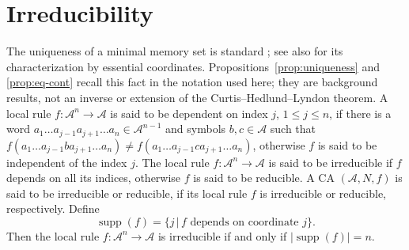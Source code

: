 \documentclass[11pt,a4paper]{article}
\newenvironment{revision}{\color{blue}}{}
\newenvironment{revision}{\color{black}}{}
\newcommand{\locmark}[1]{\label{#1}\linelabel{line:#1}}
\newcommand{\supp}{\mathop{\mathrm{supp}}}
\begin{document}
\section{Irreducibility}
\label{sec:irr}
\begin{revision}
\locmark{loc:minimal}
The uniqueness of a minimal memory set is standard
\cite[Section~1.5, Propositions~1.5.1--1.5.2]{CeccheriniCoornaert2010};
see also \cite[Proposition~1]{CastilloVeliz2024} for its characterization by
essential coordinates. Propositions~\ref{prop:uniqueness} and
\ref{prop:eq-cont} recall this fact in the notation used here; they are
background results, not an inverse or extension of the
Curtis--Hedlund--Lyndon theorem.
\end{revision}
A local rule $f : \mathcal{A}^n \to \mathcal{A}$ is said to be dependent on index $j$, $1 \le j \le n$,
if there is a word $a_1\ldots a_{j-1}a_{j+1}\ldots a_{n} \in \mathcal{A}^{n-1}$ and
symbols $b, c \in \mathcal{A}$ such that
$f(a_1\ldots a_{j-1}ba_{j+1}\ldots a_{n}) \ne f(a_1\ldots a_{j-1}ca_{j+1}\ldots a_{n})$,
otherwise $f$ is said to be independent of the index $j$.
The local rule $f: \mathcal{A}^n \to \mathcal{A}$ is said to be irreducible
if $f$ depends on all its indices, otherwise
$f$ is said to be reducible.
A CA $(\mathcal{A}, N, f)$ is said to be irreducible or reducible, if its local rule $f$ is
irreducible or reducible, respectively.
Define
 \[
\supp(f) = \{ j \, | \, \mbox{$f$ depends on coordinate $j$} \}.
\]
Then the local rule $f: \mathcal{A}^n \to \mathcal{A}$ is irreducible if and only if
$|\supp(f)| = n$.
\end{document}
